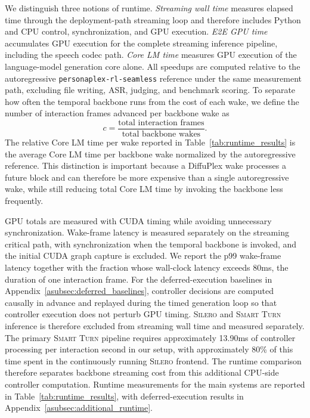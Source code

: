 We distinguish three notions of runtime.
\emph{Streaming wall time} measures elapsed time through the deployment-path streaming loop and therefore includes Python and CPU control, synchronization, and GPU execution.
\emph{E2E GPU time} accumulates GPU execution for the complete streaming inference pipeline, including the speech codec path.
\emph{Core LM time} measures GPU execution of the language-model generation core alone.
All speedups are computed relative to the autoregressive \texttt{personaplex-rl-seamless} reference under the same measurement path, excluding file writing, ASR, judging, and benchmark scoring.
To separate how often the temporal backbone runs from the cost of each wake, we define the number of interaction frames advanced per backbone wake as
\begin{equation}
c
=
\frac{\text{total interaction frames}}
     {\text{total backbone wakes}}.
\end{equation}
The relative Core LM time per wake reported in Table~\ref{tab:runtime_results} is the average Core LM time per backbone wake normalized by the autoregressive reference.
This distinction is important because a DiffuPlex wake processes a future block and can therefore be more expensive than a single autoregressive wake, while still reducing total Core LM time by invoking the backbone less frequently.

GPU totals are measured with CUDA timing while avoiding unnecessary synchronization.
Wake-frame latency is measured separately on the streaming critical path, with synchronization when the temporal backbone is invoked, and the initial CUDA graph capture is excluded.
We report the p99 wake-frame latency together with the fraction
whose wall-clock latency exceeds 80ms, the duration of one interaction frame.
For the deferred-execution baselines in Appendix~\ref{asubsec:deferred_baselines}, controller decisions are computed causally in advance and replayed during the timed generation loop so that controller execution does not perturb GPU timing.
\textsc{Silero} and \textsc{Smart Turn} inference is therefore excluded from streaming wall time and measured separately.
The primary \textsc{Smart Turn} pipeline requires approximately 13.90ms of controller processing per interaction second in our setup, with approximately 80\% of this time spent in the continuously running \textsc{Silero} frontend.
The runtime comparison therefore separates backbone streaming cost from this additional CPU-side controller computation.
Runtime measurements for the main systems are reported in
Table~\ref{tab:runtime_results}, with deferred-execution results
in Appendix~\ref{asubsec:additional_runtime}.

